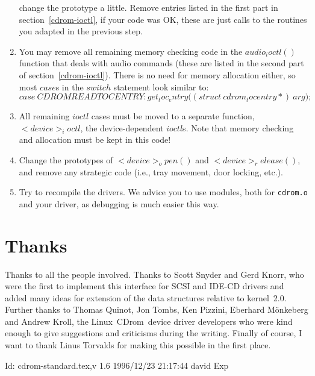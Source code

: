 \documentclass{article}
\def\version{$Id: cdrom-standard.tex,v 1.6 1996/12/23 21:17:44 david Exp $}
\def\linux{{\sc Linux}}
\def\cdrom{{\sc CDrom}}
\begin{document}
\begin{enumerate}
  change the prototype a little. Remove entries listed in the first
  part in section~\ref{cdrom-ioctl}, if your code was OK, these are
  just calls to the routines you adapted in the previous step.
\item You may remove all remaining memory checking code in the
  $audio_ioctl()$ function that deals with audio commands (these are
  listed in the second part of section~\ref{cdrom-ioctl}). There is no
  need for memory allocation either, so most $case$s in the $switch$
  statement look similar to:
  $$
  case\ CDROMREADTOCENTRY\colon get_toc_entry\bigl((struct\ 
  cdrom_tocentry *{})\ arg\bigr);
  $$
\item All remaining $ioctl$ cases must be moved to a separate
  function, $<device>_ioctl$, the device-dependent $ioctl$s. Note that
  memory checking and allocation must be kept in this code!
\item Change the prototypes of $<device>_open()$ and
  $<device>_release()$, and remove any strategic code (i.e., tray
  movement, door locking, etc.).
\item Try to recompile the drivers. We advice you to use modules, both
  for {\tt cdrom.o} and your driver, as debugging is much easier this
  way.
\end{enumerate} 

\section{Thanks}

Thanks to all the people involved. Thanks to Scott Snyder and Gerd
Knorr, who were the first to implement this interface for SCSI and
IDE-CD drivers and added many ideas for extension of the data
structures relative to kernel~2.0. Further thanks to Thomas Quinot,
Jon Tombs, Ken Pizzini, Eberhard M\"onkeberg and Andrew Kroll, the
\linux\ \cdrom\ device driver developers who were kind enough to give
suggestions and criticisms during the writing. Finally of course, I
want to thank Linus Torvalds for making this possible in the first
place.

\vfill
$ \version\ $
\eject
\end{document}
